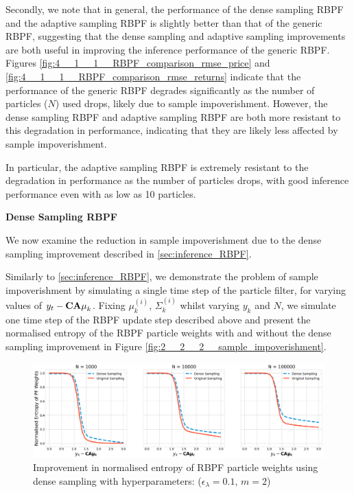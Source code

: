 \documentclass[../main.tex]{subfiles}
\begin{document}
Secondly, we note that in general, the performance of the dense sampling RBPF and the adaptive sampling RBPF is slightly better than that of the generic RBPF, suggesting that the dense sampling and adaptive sampling improvements are both useful in improving the inference performance of the generic RBPF. Figures \ref{fig:4__1__1__RBPF_comparison_rmse_price} and \ref{fig:4__1__1__RBPF_comparison_rmse_returns} indicate that the performance of the generic RBPF degrades significantly as the number of particles ($N$) used drops, likely due to sample impoverishment. However, the dense sampling RBPF and adaptive sampling RBPF are both more resistant to this degradation in performance, indicating that they are likely less affected by sample impoverishment. 

In particular, the adaptive sampling RBPF is extremely resistant to the degradation in performance as the number of particles drops, with good inference performance even with as low as 10 particles. 

\textbf{Dense Sampling RBPF}

We now examine the reduction in sample impoverishment due to the dense sampling improvement described in \autoref{sec:inference_RBPF}. 

Similarly to \autoref{sec:inference_RBPF}, we demonstrate the problem of sample impoverishment by simulating a single time step of the particle filter, for varying values of $y_t - {\bf CA\mu}_k$. Fixing $\mu_k^{(i)}$, $\Sigma_k^{(i)}$ whilst varying $y_k$ and $N$, we simulate one time step of the RBPF update step described above and present the normalised entropy of the RBPF particle weights with and without the dense sampling improvement in Figure \ref{fig:2__2__2__sample_impoverishment}.

\begin{figure}[h!]
	\centering
	\includegraphics[width=15.0cm]{../plots/4__1__1__dense_sampling.png}
	\caption{Improvement in normalised entropy of RBPF particle weights using dense sampling with hyperparameters: ($\epsilon_\lambda = 0.1$, $m=2$)}
	\label{fig:4__1__1__dense_sampling}
\end{figure}	
\end{document}
